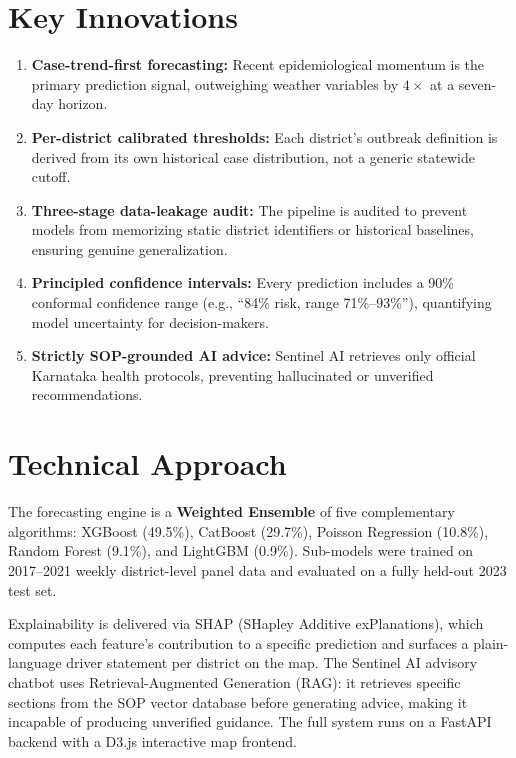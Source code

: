 \documentclass[11pt,a4paper]{article}
\begin{document}
\section{Key Innovations}
\label{sec:innovations}

\begin{enumerate}[label=\arabic*., leftmargin=*, itemsep=2pt, topsep=4pt]
  \item \textbf{Case-trend-first forecasting:} Recent epidemiological momentum is the primary prediction signal, outweighing weather variables by $4\times$ at a seven-day horizon.
  \item \textbf{Per-district calibrated thresholds:} Each district's outbreak definition is derived from its own historical case distribution, not a generic statewide cutoff.
  \item \textbf{Three-stage data-leakage audit:} The pipeline is audited to prevent models from memorizing static district identifiers or historical baselines, ensuring genuine generalization.
  \item \textbf{Principled confidence intervals:} Every prediction includes a 90\% conformal confidence range (e.g., ``84\% risk, range 71\%--93\%''), quantifying model uncertainty for decision-makers.
  \item \textbf{Strictly SOP-grounded AI advice:} Sentinel AI retrieves only official Karnataka health protocols, preventing hallucinated or unverified recommendations.
\end{enumerate}

\section{Technical Approach}
\label{sec:technical}

The forecasting engine is a \textbf{Weighted Ensemble} of five complementary algorithms: XGBoost (49.5\%), CatBoost (29.7\%), Poisson Regression (10.8\%), Random Forest (9.1\%), and LightGBM (0.9\%). Sub-models were trained on 2017--2021 weekly district-level panel data and evaluated on a fully held-out 2023 test set.

Explainability is delivered via SHAP (SHapley Additive exPlanations), which computes each feature's contribution to a specific prediction and surfaces a plain-language driver statement per district on the map. The Sentinel AI advisory chatbot uses Retrieval-Augmented Generation (RAG): it retrieves specific sections from the SOP vector database before generating advice, making it incapable of producing unverified guidance. The full system runs on a FastAPI backend with a D3.js interactive map frontend.
\end{document}
